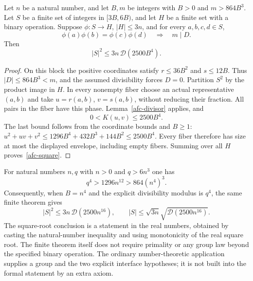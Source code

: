 \begin{proposition}
\label{afc-count}
Let $n$ be a natural number, and let $B,m$ be integers with $B>0$
and $m>864B^3$. Let $S$ be a finite
set of integers in $[3B,6B)$, and let $H$ be a finite set with a binary
operation. Suppose $\phi:S\to H$, $|H|\le3n$, and for every
$a,b,c,d\in S$,
\[
 \phi(a)\phi(b)=\phi(c)\phi(d)\quad\Longrightarrow\quad m\mid D.
\]
Then
\begin{equation}\label{afc-square}
 |S|^2\le3n\,\mathcal D(2500B^4).
\end{equation}
\end{proposition}
\begin{proof}
On this block the positive coordinates satisfy $r\le36B^2$ and
$s\le12B$. Thus $|D|\le864B^3<m$, and the assumed divisibility forces
$D=0$. Partition $S^2$ by the product image in $H$. In every nonempty
fiber choose an actual representative $(a,b)$ and take
$u=r(a,b)$, $v=s(a,b)$, without reducing their fraction.
All pairs in the fiber have this phase. Lemma~\ref{afc-divisor} applies,
and
\[
 0<K(u,v)\le2500B^4.
\]
The last bound follows from the coordinate bounds and $B\ge1$:
$u^2+uv+v^2\le1296B^4+432B^3+144B^2\le2500B^4$.
Every fiber therefore has size at most the displayed envelope, including
empty fibers. Summing over all $H$ proves~\eqref{afc-square}.
\end{proof}

For natural numbers $n,q$ with $n>0$ and $q>6n^3$ one has
\[
 q^4>1296n^{12}>864(n^4)^3.
\]
Consequently, when $B=n^4$ and the explicit divisibility modulus is $q^4$,
the same finite theorem gives
\[
 |S|^2\le3n\,\mathcal D(2500n^{16}),\qquad
 |S|\le\sqrt{3n}\sqrt{\mathcal D(2500n^{16})}.
\]
The square-root conclusion is a statement in the real numbers, obtained
by casting the natural-number inequality and using monotonicity of
the real square root. The finite theorem itself does not require
primality or any group law beyond the specified binary operation.
The ordinary number-theoretic application supplies a group and the
two explicit interface hypotheses; it is not built into the formal
statement by an extra axiom.

